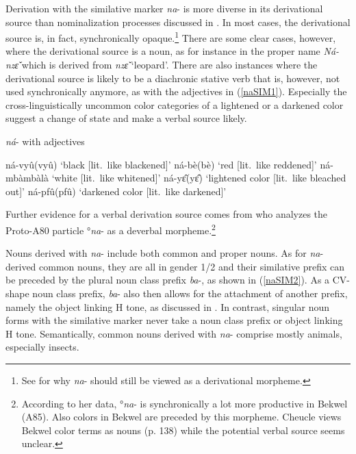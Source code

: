 Derivation with the similative marker {\itshape na}- is more diverse in its derivational source than nominalization processes discussed in . In most cases, the derivational source is, in fact, synchronically opaque.\footnote{See  for why {\itshape na}- should still be viewed as a derivational morpheme.} There are some clear cases, however, where the derivational source is a noun, as for instance in the proper name {\itshape Ná-nzɛ̌} which is derived from  {\itshape nzɛ̌} `leopard'.
There are also instances where the derivational source is likely to be a diachronic stative verb that is, however, not used synchronically anymore, as with the adjectives in (\ref{naSIM1}). Especially the cross-linguistically uncommon color categories of a lightened or a darkened color suggest a change of state and make a verbal source likely.

\begin{exe}
\ex\label{naSIM1} {\itshape ná}- with adjectives
\begin{xlist}
\ex ná-vyû(vyû) `black [lit.\ like blackened]' 
\ex ná-bè(bè) `red [lit.\ like reddened]' 
\ex ná-mbàmbàlà `white [lit.\ like whitened]' 
\ex ná-yɛ̂(yɛ̂) `lightened color [lit.\ like bleached out]'
\ex ná-pfû(pfû) `darkened color [lit.\ like darkened]'
\end{xlist}
\end{exe}

\noindent Further evidence for a verbal derivation source comes from \citet[382]{cheucle2014} who analyzes the Proto-A80 particle °{\itshape na}- as a deverbal morpheme.\footnote{According to her data, °{\itshape na}- is synchronically a lot more productive in Bekwel (A85). Also colors in Bekwel are preceded by this morpheme. Cheucle views Bekwel color terms as nouns (p. 138) while the potential verbal source seems unclear.}

Nouns derived with {\itshape na}- include both common and proper nouns. As for {\itshape na}- derived common nouns, they are all in gender 1/2 and their similative prefix can be preceded by the plural noun class prefix {\itshape ba}-, as shown in (\ref{naSIM2}). As a CV- shape noun class prefix, {\itshape ba}- also then allows for the attachment of another prefix, namely the object linking H tone, as discussed in .  In contrast, singular noun forms with the similative marker never take a noun class prefix or  object linking H tone.  Semantically, common nouns derived with {\itshape na}- comprise mostly animals, especially insects.

